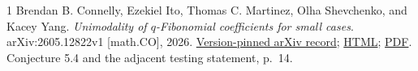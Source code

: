 \documentclass[11pt]{article}
\theoremstyle{research}
\theoremstyle{definition}
\numberwithin{equation}{section}
\begin{document}
\begin{thebibliography}{1}
Brendan B. Connelly, Ezekiel Ito, Thomas C. Martinez,
Olha Shevchenko, and Kacey Yang.
\newblock \emph{Unimodality of $q$-Fibonomial coefficients for small cases}.
\newblock arXiv:2605.12822v1 [math.CO], 2026.
\newblock \href{https://arxiv.org/abs/2605.12822v1}{Version-pinned arXiv record};
\href{https://arxiv.org/html/2605.12822v1}{HTML};
\href{https://arxiv.org/pdf/2605.12822v1}{PDF}.
\newblock Conjecture 5.4 and the adjacent testing statement, p.~14.
\end{thebibliography}
\end{document}
